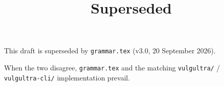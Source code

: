 \documentclass{article}
\title{Superseded}
\begin{document}
\maketitle

This draft is superseded by \texttt{grammar.tex} (v3.0, 20 September 2026).

When the two disagree, \texttt{grammar.tex} and the matching
\texttt{vulgultra/} / \texttt{vulgultra-cli/} implementation prevail.
\end{document}
